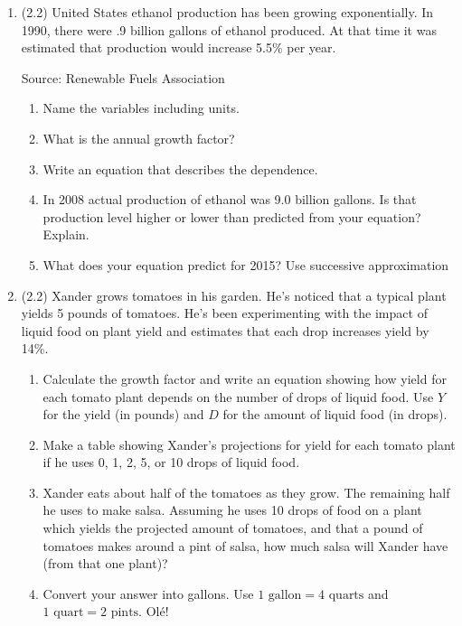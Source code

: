 \documentclass[12pt]{article}
\begin{document}
\begin{enumerate}
\item (2.2) United States ethanol production has been growing exponentially. In 1990, there were .9 billion gallons of ethanol produced.  At that time it was estimated that production would increase 5.5\% per year.
\hfill \begin{footnotesize} Source:  Renewable Fuels Association \end{footnotesize} 
\begin{enumerate}
\item Name the variables including units. 
\item What is the annual growth factor?
\item Write an equation that describes the dependence.
\item In 2008 actual production of ethanol was 9.0 billion gallons.  Is that production level higher or lower than predicted from your equation?  Explain.
\item What does your equation predict for 2015?  Use successive approximation
\end{enumerate}  %

\item (2.2) Xander grows tomatoes in his garden.  He's noticed that a typical plant yields 5 pounds of tomatoes.  He's been experimenting with the impact of liquid food on plant yield and estimates that each drop increases yield by 14\%.
\begin{enumerate}
\item Calculate the growth factor and write an equation showing how yield for each tomato plant depends on the number of drops of liquid food.  Use $Y$ for the yield (in pounds) and $D$ for the amount of liquid food (in drops).
\item Make a table showing Xander's projections for yield for each tomato plant  if he uses 0, 1, 2, 5, or 10 drops of liquid food.
\item Xander eats about half of the tomatoes as they grow.  The remaining half he uses to make salsa.  Assuming he uses 10 drops of food on a plant which yields the projected amount of tomatoes, and that a pound of tomatoes makes around a pint of salsa, how much salsa will Xander have (from that one plant)?
\item Convert your answer into gallons.  Use $1 \text{ gallon} = 4 \text{ quarts}$ and $1 \text{ quart} = 2 \text{ pints}.$  Ol\'e!
\end{enumerate}


\end{enumerate}
\end{document}
